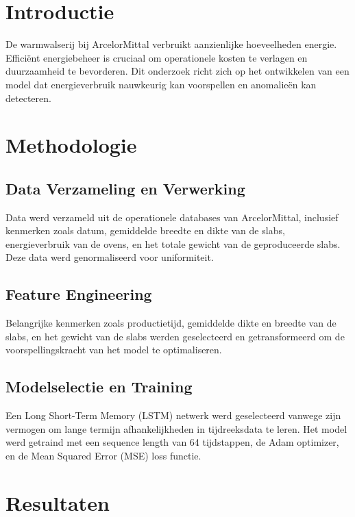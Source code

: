 \documentclass[a0,portrait]{hogent-poster}
\begin{document}
\begin{multicols}{2} %

\section{Introductie}

De warmwalserij bij ArcelorMittal verbruikt aanzienlijke hoeveelheden energie. Efficiënt energiebeheer is cruciaal om operationele kosten te verlagen en duurzaamheid te bevorderen. Dit onderzoek richt zich op het ontwikkelen van een model dat energieverbruik nauwkeurig kan voorspellen en anomalieën kan detecteren.

\section{Methodologie}

\subsection{Data Verzameling en Verwerking}
Data werd verzameld uit de operationele databases van ArcelorMittal, inclusief kenmerken zoals datum, gemiddelde breedte en dikte van de slabs, energieverbruik van de ovens, en het totale gewicht van de geproduceerde slabs. Deze data werd genormaliseerd voor uniformiteit.

\subsection{Feature Engineering}
Belangrijke kenmerken zoals productietijd, gemiddelde dikte en breedte van de slabs, en het gewicht van de slabs werden geselecteerd en getransformeerd om de voorspellingskracht van het model te optimaliseren.

\subsection{Modelselectie en Training}
Een Long Short-Term Memory (LSTM) netwerk werd geselecteerd vanwege zijn vermogen om lange termijn afhankelijkheden in tijdreeksdata te leren. Het model werd getraind met een sequence length van 64 tijdstappen, de Adam optimizer, en de Mean Squared Error (MSE) loss functie.

\section{Resultaten}


\end{multicols}
\end{document}
